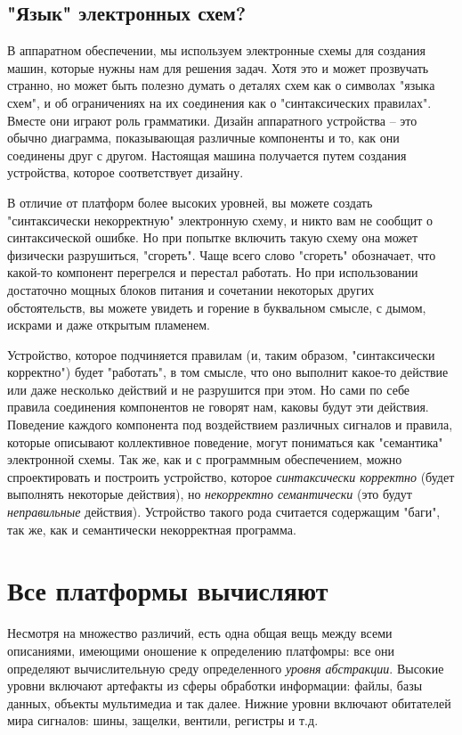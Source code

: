 \subsection{"Язык" электронных схем?}

В аппаратном обеспечении, мы используем электронные схемы для создания машин, которые нужны нам для решения задач.  Хотя это и может прозвучать странно, но может быть полезно думать о деталях схем как о символах "языка схем", и об ограничениях на их соединения как о "синтаксических правилах".  Вместе они играют роль грамматики.  Дизайн аппаратного устройства -- это обычно диаграмма, показывающая различные компоненты и то, как они соединены друг с другом.  Настоящая машина получается путем создания устройства, которое соответствует дизайну.

В отличие от платформ более высоких уровней, вы можете создать "синтаксически некорректную" электронную схему, и никто вам не сообщит о синтаксической ошибке.  Но при попытке включить такую схему она может физически разрушиться, "сгореть".  Чаще всего слово "сгореть" обозначает, что какой-то компонент перегрелся и перестал работать.  Но при использовании достаточно мощных блоков питания и сочетании некоторых других обстоятельств, вы можете увидеть и горение в буквальном смысле, с дымом, искрами и даже открытым пламенем.

Устройство, которое подчиняется правилам (и, таким образом, "синтаксически корректно") будет "работать", в том смысле, что оно выполнит какое-то действие или даже несколько действий и не разрушится при этом.  Но сами по себе правила соединения компонентов не говорят нам, каковы будут эти действия.  Поведение каждого компонента под воздействием различных сигналов и правила, которые описывают коллективное поведение, могут пониматься как "семантика" электронной схемы.  Так же, как и с программным обеспечением, можно спроектировать и построить устройство, которое \emph{синтаксически корректно} (будет выполнять некоторые действия), но \emph{некорректно семантически} (это будут \emph{неправильные} действия).  Устройство такого рода считается содержащим "баги", так же, как и семантически некорректная программа.

\section{Все платформы вычисляют}

Несмотря на множество различий, есть одна общая вещь между всеми описаниями, имеющими оношение к определению платфомры: все они определяют
вычислительную среду определенного  \emph{уровня абстракции}.  Высокие уровни включают артефакты из сферы обработки информации: файлы, базы данных, объекты мультимедиа и так далее.  Нижние уровни включают обитателей мира сигналов: шины, защелки, вентили, регистры и т.д.

